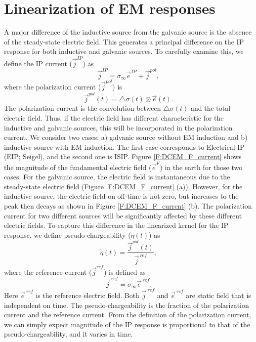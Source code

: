 \documentclass[a4paper, 11pt]{article}
\newcommand{\siginf}{\sigma_\infty}
\newcommand{\dsig}{\triangle\sigma}
\renewcommand {\j}  { {\vec j} }
\newcommand {\e}  { {\vec e} }
\newcommand{\peta}{\tilde{\eta}}
\newcommand{\eref}{\e^{\ ref}}
\begin{document}
\section{Linearization of EM responses}
A major difference of the inductive source from the galvanic source is the absence of the steady-state electric field. 
This generates a principal difference on the IP response for both inductive and galvanic sources. 
To carefully examine this, we define the IP current ($\j^{IP}$) as
\begin{equation}
  \j^{IP} = \siginf \e^{IP} + \j^{pol},
  \label{eq:IP_current}
\end{equation}
where the polarization current ($\j^{pol}$) is
\begin{equation}
  \j^{pol}(t) = \dsig(t) \otimes \e(t).
  \label{eq:polarization_current}
\end{equation}
The polarization current is the convolution between $\dsig (t)$ and the total electric field. 
Thus, if the electric field has different characteristic for the inductive and galvanic sources, this will be incorporated in the polarization current.
We consider two cases: a) galvanic source without EM induction and b) inductive source with EM induction. The first case corresponds to Electrical IP (EIP; Seigel), and the second one is ISIP.
Figure \ref{F:DCEM_F_current} shows the magnitude of the fundamental electric field ($\e^{F}$) in the earth for those two cases. 
For the galvanic source, the electric field is instantaneous due to the steady-state electric field (Figure \ref{F:DCEM_F_current} (a)). 
However, for the inductive source, the electric field on off-time is not zero, but increases to the peak then decays as shown in Figure \ref{F:DCEM_F_current} (b). 
The polarization current for two different sources will be significantly affected by these different electric fields. 
To capture this difference in the linearized kernel for the IP response, we define pseudo-chargeability ($\peta(t)$) as 
\begin{equation}
  \peta(t) = \frac{\j^{pol}(t)}{\j^{\ ref}},
  \label{eq:pseudochargeability_0}
\end{equation}
where the reference current ($\j^{ref}$) is defined as 
\begin{equation}
  \j^{\ ref} = \siginf \eref.
  \label{eq:reference_current}
\end{equation}
Here $\eref$ is the reference electric field. 
Both $\j^{\ ref}$ and $\eref$ are static field that is independent on time. 
The pseudo-chargeability is the fraction of the polarization current and the reference current. From the definition of the polarization current, we can simply expect magnitude of the IP response is proportional to that of the pseudo-chargeability, and it varies in time. 
\end{document}
